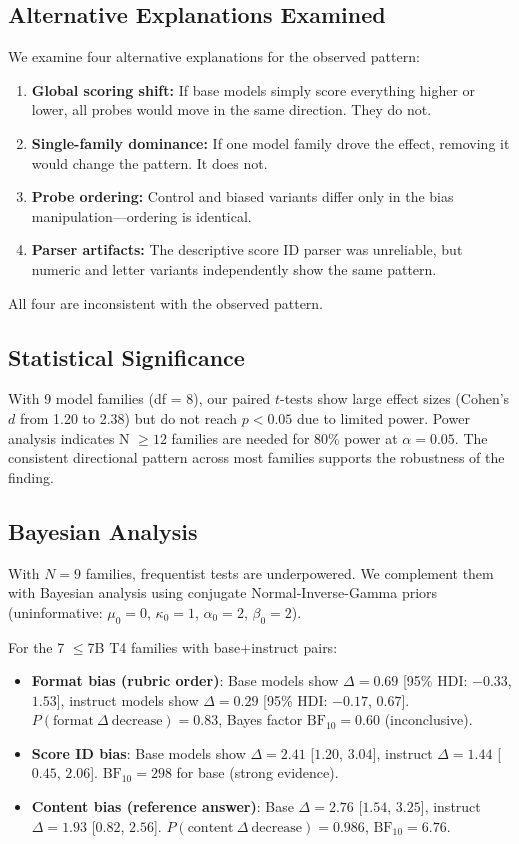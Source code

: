 \documentclass[11pt,preprint,nonatbib]{article}
\begin{document}
\subsection{Alternative Explanations Examined}
We examine four alternative explanations for the observed pattern:
\begin{enumerate}
    \item \textbf{Global scoring shift:} If base models simply score everything higher or lower, all probes would move in the same direction. They do not.
    \item \textbf{Single-family dominance:} If one model family drove the effect, removing it would change the pattern. It does not.
    \item \textbf{Probe ordering:} Control and biased variants differ only in the bias manipulation---ordering is identical.
    \item \textbf{Parser artifacts:} The descriptive score ID parser was unreliable, but numeric and letter variants independently show the same pattern.
\end{enumerate}
All four are inconsistent with the observed pattern.

\subsection{Statistical Significance}
With 9 model families (df = 8), our paired $t$-tests show large effect sizes (Cohen's $d$ from 1.20 to 2.38) but do not reach $p < 0.05$ due to limited power. Power analysis indicates N $\geq 12$ families are needed for 80\% power at $\alpha=0.05$. The consistent directional pattern across most families supports the robustness of the finding.

\subsection{Bayesian Analysis}
With $N=9$ families, frequentist tests are underpowered. We complement them with Bayesian analysis using conjugate Normal-Inverse-Gamma priors (uninformative: $\mu_0=0$, $\kappa_0=1$, $\alpha_0=2$, $\beta_0=2$).

For the 7 $\leq$7B T4 families with base+instruct pairs:
\begin{itemize}
    \item \textbf{Format bias (rubric order)}: Base models show $\Delta=0.69$ [95\% HDI: $-0.33$, $1.53$], instruct models show $\Delta=0.29$ [95\% HDI: $-0.17$, $0.67$]. $P(\text{format}~\Delta~\text{decrease}) = 0.83$, Bayes factor $\text{BF}_{10} = 0.60$ (inconclusive).
    \item \textbf{Score ID bias}: Base models show $\Delta=2.41$ [$1.20$, $3.04$], instruct $\Delta=1.44$ [$0.45$, $2.06$]. $\text{BF}_{10} = 298$ for base (strong evidence).
    \item \textbf{Content bias (reference answer)}: Base $\Delta=2.76$ [$1.54$, $3.25$], instruct $\Delta=1.93$ [$0.82$, $2.56$]. $P(\text{content}~\Delta~\text{decrease}) = 0.986$, $\text{BF}_{10} = 6.76$.
\end{itemize}
\end{document}
